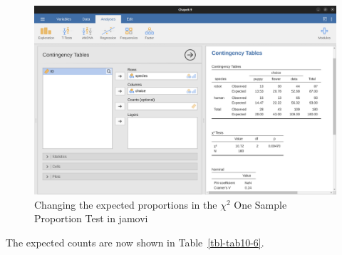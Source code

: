 \documentclass[
  a4paper,
]{book}
\begin{document}
\begin{figure}

\includegraphics[width=1\textwidth,height=\textheight]{images/fig10-5.png} \hfill{}

\caption{\label{fig-fig10-5}Changing the expected proportions in the
\(\chi^2\) One Sample Proportion Test in jamovi}

\end{figure}

The expected counts are now shown in Table~\ref{tbl-tab10-6}.

\hypertarget{tbl-tab10-6}{}
 
  \providecommand{\huxb}[2]{\arrayrulecolor[RGB]{#1}\global\arrayrulewidth=#2pt}
  \providecommand{\huxvb}[2]{\color[RGB]{#1}\vrule width #2pt}
  \providecommand{\huxtpad}[1]{\rule{0pt}{#1}}
  \providecommand{\huxbpad}[1]{\rule[-#1]{0pt}{#1}}
\end{document}
